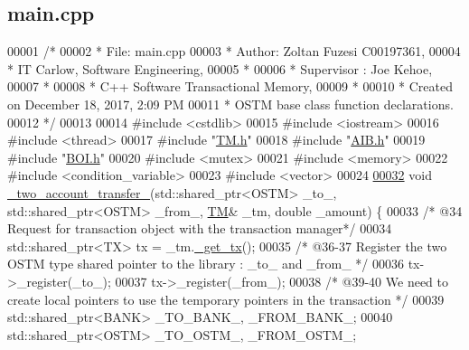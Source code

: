 \hypertarget{main_8cpp_source}{}\subsection{main.\+cpp}

\begin{DoxyCode}
00001 \textcolor{comment}{/*}
00002 \textcolor{comment}{ * File:   main.cpp}
00003 \textcolor{comment}{ * Author: Zoltan Fuzesi C00197361, }
00004 \textcolor{comment}{ * IT Carlow, Software Engineering, }
00005 \textcolor{comment}{ *}
00006 \textcolor{comment}{ * Supervisor : Joe Kehoe, }
00007 \textcolor{comment}{ *}
00008 \textcolor{comment}{ * C++ Software Transactional Memory, }
00009 \textcolor{comment}{ * }
00010 \textcolor{comment}{ * Created on December 18, 2017, 2:09 PM}
00011 \textcolor{comment}{ * OSTM base class function declarations.}
00012 \textcolor{comment}{ */}
00013 
00014 \textcolor{preprocessor}{#include <cstdlib>}
00015 \textcolor{preprocessor}{#include <iostream>}
00016 \textcolor{preprocessor}{#include <thread>}
00017 \textcolor{preprocessor}{#include "\hyperlink{_t_m_8h}{TM.h}"}
00018 \textcolor{preprocessor}{#include "\hyperlink{_a_i_b_8h}{AIB.h}"}   
00019 \textcolor{preprocessor}{#include "\hyperlink{_b_o_i_8h}{BOI.h}"}    
00020 \textcolor{preprocessor}{#include <mutex>}
00021 \textcolor{preprocessor}{#include <memory>}
00022 \textcolor{preprocessor}{#include <condition\_variable>}
00023 \textcolor{preprocessor}{#include <vector>}
00024 
\hypertarget{main_8cpp_source.tex_l00032}{}\hyperlink{main_8cpp_a83aef8c5b69afef4e38d14c17fe782b3_a83aef8c5b69afef4e38d14c17fe782b3}{00032} \textcolor{keywordtype}{void} \hyperlink{main_8cpp_a83aef8c5b69afef4e38d14c17fe782b3_a83aef8c5b69afef4e38d14c17fe782b3}{\_two\_account\_transfer\_}(std::shared\_ptr<OSTM> \_to\_, std::shared\_ptr<OSTM> \_from\_,
       \hyperlink{class_t_m}{TM}& \_tm, \textcolor{keywordtype}{double} \_amount) \{
00033     \textcolor{comment}{/* @34 Request for transaction object with the transaction manager*/}
00034     std::shared\_ptr<TX> tx = \_tm.\hyperlink{class_t_m_a41cb0226cc4080c931651b13f74a0075_a41cb0226cc4080c931651b13f74a0075}{\_get\_tx}();
00035     \textcolor{comment}{/* @36-37 Register the two OSTM type shared pointer to the library : \_to\_ and \_from\_ */}
00036     tx->\_register(\_to\_);
00037     tx->\_register(\_from\_);
00038     \textcolor{comment}{/*  @39-40 We need to create local pointers to use the temporary pointers in the transaction */}
00039     std::shared\_ptr<BANK> \_TO\_BANK\_, \_FROM\_BANK\_;
00040     std::shared\_ptr<OSTM> \_TO\_OSTM\_, \_FROM\_OSTM\_;

\end{DoxyCode}
